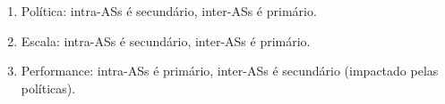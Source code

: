 \begin{enumerate}
\def\labelenumi{\arabic{enumi}.}
\tightlist
\item
  Política: intra-ASs é secundário, inter-ASs é primário.
\item
  Escala: intra-ASs é secundário, inter-ASs é primário.
\item
  Performance: intra-ASs é primário, inter-ASs é secundário (impactado
  pelas políticas).
\end{enumerate}